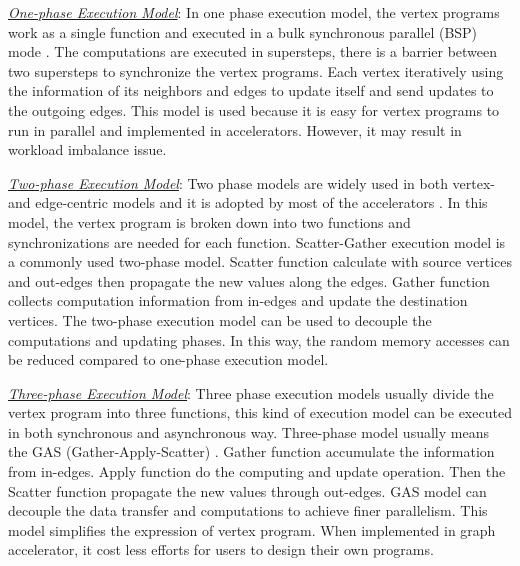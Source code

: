\documentclass[twoside]{article}
\begin{document}
\begin{multicols}{2}
\underline{\em One-phase Execution Model}: In one phase execution model, the vertex programs work as a single function and executed in a bulk synchronous parallel (BSP) mode \cite{Malewicz2010pregel, betkaoui2012fpgabfs}. The computations are executed in supersteps, there is a barrier between two supersteps to synchronize the vertex programs. Each vertex iteratively using the information of its neighbors and edges to update itself and send updates to the outgoing edges. This model is used because it is easy for vertex programs to run in parallel and implemented in accelerators. However, it may result in workload imbalance issue.

\underline{\em Two-phase Execution Model}: Two phase models are widely used in both vertex- and edge-centric models and it is adopted by most of the accelerators \cite{Roy2013x-stream,ham2016graphicionado}. In this model, the vertex program is broken down into two functions and synchronizations are needed for each function. Scatter-Gather execution model is a commonly used two-phase model. Scatter function calculate with source vertices and out-edges then propagate the new values along the edges. Gather function collects computation information from in-edges and update the destination vertices. The two-phase execution model can be used to decouple the computations and updating phases. In this way, the random memory accesses can be reduced compared to one-phase execution model.

\underline{\em Three-phase Execution Model}: Three phase execution models usually divide the vertex program into three functions, this kind of execution model can be executed in both synchronous and asynchronous way. Three-phase model usually means the GAS (Gather-Apply-Scatter) \cite{Gonzalez2012powergraph, ozdal2016energy}. Gather function accumulate the information from in-edges. Apply function do the computing and update operation. Then the Scatter function propagate the new values through out-edges. GAS model can decouple the data transfer and computations to achieve finer parallelism. This model simplifies the expression of vertex program. When implemented in graph accelerator, it cost less efforts for users to design their own programs.  




\end{multicols}
\end{document}
